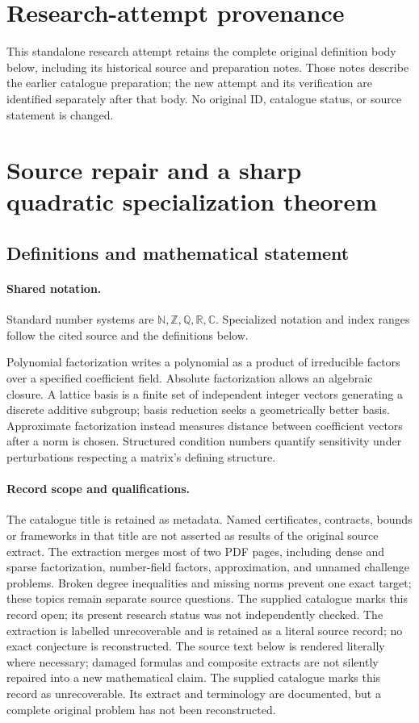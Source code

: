 \documentclass[11pt]{article}
\begin{document}
\section*{Research-attempt provenance}
This standalone research attempt retains the complete original definition body below,
including its historical source and preparation notes. Those notes describe the
earlier catalogue preparation; the new attempt and its verification are identified
separately after that body. No original ID, catalogue status, or source statement is changed.

\section{Source repair and a sharp quadratic specialization theorem}\label{statement}

\subsection{Definitions and mathematical statement}

\paragraph{Shared notation.}Standard number systems are $\mathbb N,\mathbb Z,\mathbb Q,\mathbb R,\mathbb C$. Specialized notation and index ranges follow the cited source and the definitions below.


Polynomial factorization writes a polynomial as a product of irreducible factors over a specified coefficient field. Absolute factorization allows an algebraic closure. A lattice basis is a finite set of independent integer vectors generating a discrete additive subgroup; basis reduction seeks a geometrically better basis. Approximate factorization instead measures distance between coefficient vectors after a norm is chosen. Structured condition numbers quantify sensitivity under perturbations respecting a matrix's defining structure.
\paragraph{Record scope and qualifications.}
The catalogue title is retained as metadata. Named certificates, contracts, bounds or frameworks in that title are not asserted as results of the original source extract.
The extraction merges most of two PDF pages, including dense and sparse factorization, number-field factors, approximation, and unnamed challenge problems. Broken degree inequalities and missing norms prevent one exact target; these topics remain separate source questions. The supplied catalogue marks this record open; its present research status was not independently checked. The extraction is labelled unrecoverable and is retained as a literal source record; no exact conjecture is reconstructed.
The source text below is rendered literally where necessary; damaged formulas and composite extracts are not silently repaired into a new mathematical claim.
The supplied catalogue marks this record as unrecoverable. Its extract and terminology are documented, but a complete original problem has not been reconstructed.
\end{document}

